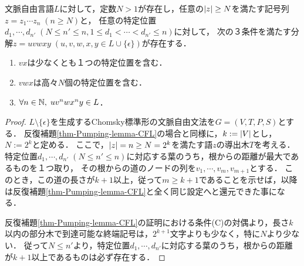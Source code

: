 \documentclass[uplatex, dvipdfmx]{jsreport}
\begin{document}
\begin{theorem}[Ogden]\label{thm-Ogden}
    文脈自由言語$L$に対して，定数$N>1$が存在し，任意の$\lvert z\rvert\ge N$を満たす記号列$z=z_1\cdots z_n\;(n\ge N)$と，
    任意の特定位置$d_1,\cdots,d_{n'}\;(N\le n'\le n,1\le d_1<\cdots<d_{n'}\le n)$に対して，
    次の３条件を満たす分解$z=uvwxy\;(u,v,w,x,y\in L\cup\{\epsilon\})$が存在する．
    \begin{enumerate}
        \item $vx$は少なくとも１つの特定位置を含む．
        \item $vwx$は高々$N$個の特定位置を含む．
        \item $\forall n\in\mathbb{N},\;uv^nwx^ny\in L$．
    \end{enumerate}
\end{theorem}
\begin{proof}
    $L\setminus\{\epsilon\}$を生成するChomsky標準形の文脈自由文法を$G=(V,T,P,S)$とする．
    反復補題\ref{thm-Pumping-lemma-CFL}の場合と同様に，$k:=\lvert V\rvert$とし，$N:=2^k$と定める．
    ここで，$\lvert z\rvert=n\ge N=2^k$を満たす語$z$の導出木$T$を考える．
    特定位置$d_1,\cdots,d_{n'}\;(N\le n'\le n)$に対応する葉のうち，根からの距離が最大であるものを１つ取り，
    その根からの道のノードの列を$v_1,\cdots,v_m,v_{m+1}$とする．
    このとき，この道の長さが$k+1$以上，従って$m\ge k+1$であることを示せば，以降は反復補題\ref{thm-Pumping-lemma-CFL}と全く同じ設定へと還元できた事になる．

    反復補題\ref{thm-Pumping-lemma-CFL}の証明における条件(C)の対偶より，長さ$k$以内の部分木で到達可能な終端記号は，$2^{k+1}$文字よりも少なく，特に$N$より少ない．
    従って$N\le n'$より，特定位置$d_1,\cdots,d_{n'}$に対応する葉のうち，根からの距離が$k+1$以上であるものは必ず存在する．
\end{proof}
\end{document}
